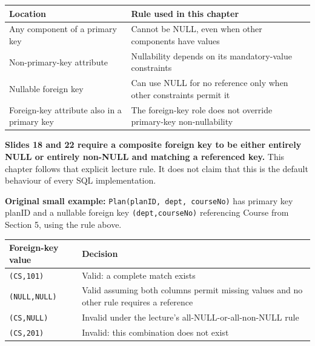 \begin{longtable}[]{@{}
  >{\raggedright\arraybackslash}p{}
  >{\raggedright\arraybackslash}p{}@{}}
\toprule\noalign{}
\begin{minipage}[b]{\linewidth}\raggedright
Location
\end{minipage} & \begin{minipage}[b]{\linewidth}\raggedright
Rule used in this chapter
\end{minipage} \\
\midrule\noalign{}
\endhead
\bottomrule\noalign{}
\endlastfoot
Any component of a primary key & Cannot be NULL, even when other components have values \\
Non-primary-key attribute & Nullability depends on its mandatory-value constraints \\
Nullable foreign key & Can use NULL for no reference only when other constraints permit it \\
Foreign-key attribute also in a primary key & The foreign-key role does not override primary-key non-nullability \\
\end{longtable}

\textbf{Slides 18 and 22 require a composite foreign key to be either entirely NULL or entirely non-NULL and matching a referenced key.} This chapter follows that explicit lecture rule. It does not claim that this is the default behaviour of every SQL implementation.

\textbf{Original small example:} \texttt{Plan(\allowbreak{}planID,\allowbreak{}\ dept,\allowbreak{}\ courseNo)\allowbreak{}} has primary key planID and a nullable foreign key \texttt{(\allowbreak{}dept,\allowbreak{}courseNo)\allowbreak{}} referencing Course from Section 5, using the rule above.

\begin{longtable}[]{@{}
  >{\raggedright\arraybackslash}p{}
  >{\raggedright\arraybackslash}p{}@{}}
\toprule\noalign{}
\begin{minipage}[b]{\linewidth}\raggedright
Foreign-key value
\end{minipage} & \begin{minipage}[b]{\linewidth}\raggedright
Decision
\end{minipage} \\
\midrule\noalign{}
\endhead
\bottomrule\noalign{}
\endlastfoot
\texttt{(\allowbreak{}CS,\allowbreak{}101)\allowbreak{}} & Valid: a complete match exists \\
\texttt{(\allowbreak{}NULL,\allowbreak{}NULL)\allowbreak{}} & Valid assuming both columns permit missing values and no other rule requires a reference \\
\texttt{(\allowbreak{}CS,\allowbreak{}NULL)\allowbreak{}} & Invalid under the lecture's all-NULL-or-all-non-NULL rule \\
\texttt{(\allowbreak{}CS,\allowbreak{}201)\allowbreak{}} & Invalid: this combination does not exist \\
\end{longtable}

